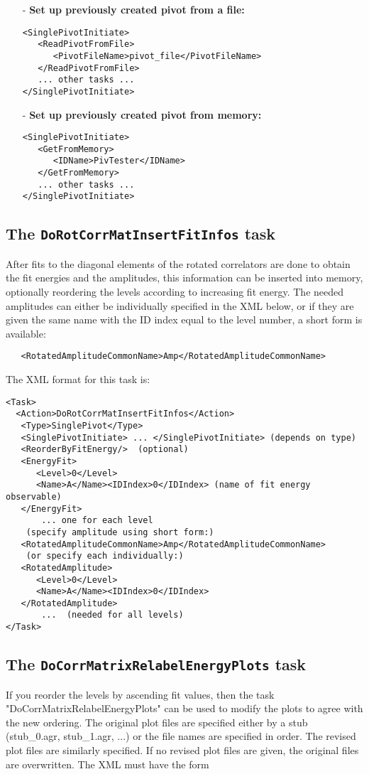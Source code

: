 \documentclass[12pt]{article}
\newcommand{\vb}{\texttt}
\begin{document}
\begin{itemize}
\item[-] \textbf{Set up previously created pivot from a file:}
\begin{verbatim}
<SinglePivotInitiate>
   <ReadPivotFromFile>
      <PivotFileName>pivot_file</PivotFileName>
   </ReadPivotFromFile>
   ... other tasks ...
</SinglePivotInitiate>
\end{verbatim}

\item[-] \textbf{Set up previously created pivot from memory:}
\begin{verbatim}
<SinglePivotInitiate>
   <GetFromMemory>
      <IDName>PivTester</IDName>
   </GetFromMemory>
   ... other tasks ...
</SinglePivotInitiate>
\end{verbatim}
\end{itemize}

\subsection{The \vb{DoRotCorrMatInsertFitInfos} task}
After fits to the diagonal elements of the rotated correlators are done
to obtain the fit energies and the amplitudes, this information can be
inserted into memory, optionally reordering the levels according to
increasing fit energy. The needed amplitudes can either be individually
specified in the XML below, or if they are given the same name with the ID
index equal to the level number, a short form is available:
\begin{verbatim}
   <RotatedAmplitudeCommonName>Amp</RotatedAmplitudeCommonName>
\end{verbatim}

The XML format for this task is:
\begin{verbatim}
<Task>
  <Action>DoRotCorrMatInsertFitInfos</Action>
   <Type>SinglePivot</Type>
   <SinglePivotInitiate> ... </SinglePivotInitiate> (depends on type)
   <ReorderByFitEnergy/>  (optional)
   <EnergyFit>
      <Level>0</Level>
      <Name>A</Name><IDIndex>0</IDIndex> (name of fit energy observable)
   </EnergyFit>
       ... one for each level
    (specify amplitude using short form:)
   <RotatedAmplitudeCommonName>Amp</RotatedAmplitudeCommonName>
    (or specify each individually:)
   <RotatedAmplitude>
      <Level>0</Level>
      <Name>A</Name><IDIndex>0</IDIndex>
   </RotatedAmplitude>
       ...  (needed for all levels)
</Task>
\end{verbatim}

\subsection{The \vb{DoCorrMatrixRelabelEnergyPlots} task}
If you reorder the levels by ascending fit values, then the task
"DoCorrMatrixRelabelEnergyPlots" can be used to modify the plots to
agree with the new ordering.  The original plot files are specified either
by a stub (stub\_0.agr, stub\_1.agr, ...) or the file names are specified
in order.  The revised plot files are similarly specified.  If no revised
plot files are given, the original files are overwritten.  The XML must
have the form
\end{document}
